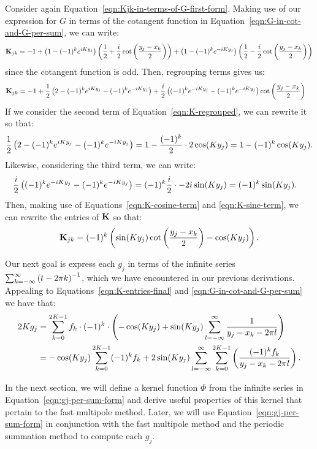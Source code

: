 Consider again Equation~\ref{eqn:Kjk-in-terms-of-G-first-form}. Making
use of our expression for $G$ in terms of the cotangent function in
Equation~\ref{eqn:G-in-cot-and-G-per-sum}, we can write:
\begin{align*}
  \bold{K}_{jk} = -1 + \left(1 - (-1)^ke^{iKy_j}\right) \left({1 \over 2} + {i \over 2}\cot\left(y_j - x_k \over 2\right)\right) + \left(1 - (-1)^ke^{-iKy_j}\right) \left({1 \over 2} - {i \over 2} \cot \left(y_j - x_k \over 2\right)\right)
\end{align*}
since the cotangent function is odd. Then, regrouping terms gives us:
\begin{align} \label{eqn:K-regrouped}
  \bold{K}_{jk} &= -1 + {1 \over 2} \left(2 - (-1)^ke^{iKy_j} - (-1)^ke^{-iKy_j}\right) + {i \over 2} \left((-1)^ke^{-iKy_j} - (-1)^ke^{-iKy_j}\right) \cot \left(y_j - x_k \over 2\right)
\end{align}
If we consider the second term of Equation~\ref{eqn:K-regrouped}, we
can rewrite it so that:
\begin{align} \label{eqn:K-cosine-term}
  {1 \over 2} \left(2 - (-1)^ke^{iKy_j} - (-1)^ke^{-iKy_j}\right) = 1 - {(-1)^k \over 2} \cdot 2 \cos(Ky_j) = 1 - (-1)^k \cos(Ky_j).
\end{align}
Likewise, considering the third term, we can write:
\begin{align} \label{eqn:K-sine-term}
  {i \over 2} \left((-1)^ke^{-iKy_j} - (-1)^ke^{-iKy_j}\right)
  &= (-1)^k {i \over 2} \cdot -2i \sin(Ky_j) = (-1)^k \sin(Ky_j).
\end{align}
Then, making use of Equations~\ref{eqn:K-cosine-term} and
\ref{eqn:K-sine-term}, we can rewrite the entries of $\bold{K}$ so
that:
\begin{align} \label{eqn:K-entries-final}
  \bold{K}_{jk} = (-1)^k \left(\sin(Ky_j) \cot \left(y_j - x_k \over 2\right) - \cos(Ky_j)\right).
\end{align}

Our next goal is express each $g_j$ in terms of the infinite series
$\sum_{k=-\infty}^\infty \left(t - 2 \pi k\right)^{-1}$, which we have
encountered in our previous derivations. Appealing to
Equations~\ref{eqn:K-entries-final} and
\ref{eqn:G-in-cot-and-G-per-sum} we have that:
\begin{align}
  2K g_j &= \sum_{k=0}^{2K-1} f_k \cdot (-1)^k \cdot \left(-\cos(Ky_j) + \sin(Ky_j) \sum_{l=-\infty}^\infty {1 \over y_j - x_k - 2\pi l}\right) \notag \\
  &= - \cos(Ky_j) \sum_{k=0}^{2K-1} (-1)^k f_k + 2 \sin(Ky_j) \sum_{l=-\infty}^\infty \sum_{k=0}^{2K-1} \left((-1)^k f_k \over y_j - x_k - 2\pi l\right). \label{eqn:gj-per-sum-form}
\end{align}

In the next section, we will define a kernel function $\Phi$ from the
infinite series in Equation~\ref{eqn:gj-per-sum-form} and derive
useful properties of this kernel that pertain to the fast multipole
method. Later, we will use Equation~\ref{eqn:gj-per-sum-form} in
conjunction with the fast multipole method and the periodic
summation method to compute each $g_j$.

